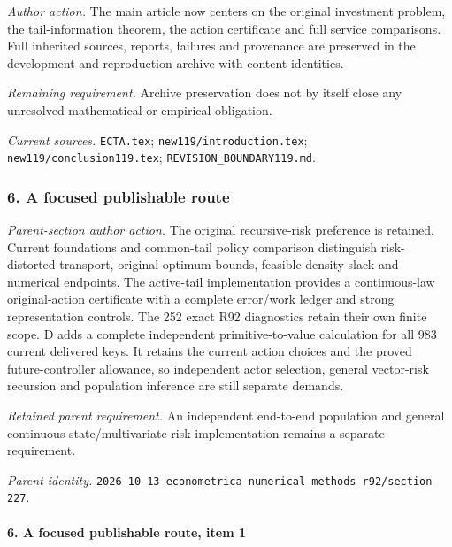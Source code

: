 \par\emph{Author action.} The main article now centers on the original investment problem, the tail-information theorem, the action certificate and full service comparisons. Full inherited sources, reports, failures and provenance are preserved in the development and reproduction archive with content identities.

\par\emph{Remaining requirement.} Archive preservation does not by itself close any unresolved mathematical or empirical obligation.

\par\emph{Current sources.} \nolinkurl{ECTA.tex}; \nolinkurl{new119/introduction.tex}; \nolinkurl{new119/conclusion119.tex}; \nolinkurl{REVISION_BOUNDARY119.md}.

\subsubsection{6. A focused publishable route}

\emph{Parent-section author action.} The original recursive-risk preference is retained. Current foundations and common-tail policy comparison distinguish risk-distorted transport, original-optimum bounds, feasible density slack and numerical endpoints. The active-tail implementation provides a continuous-law original-action certificate with a complete error/\allowbreak{}work ledger and strong representation controls. The 252 exact R92 diagnostics retain their own finite scope. D adds a complete independent primitive-to-value calculation for all 983 current delivered keys. It retains the current action choices and the proved future-controller allowance, so independent actor selection, general vector-risk recursion and population inference are still separate demands.

\par\emph{Retained parent requirement.} An independent end-to-end population and general continuous-state/\allowbreak{}multivariate-risk implementation remains a separate requirement.

\par\emph{Parent identity.} \nolinkurl{2026-10-13-econometrica-numerical-methods-r92/section-227}.

\paragraph{6. A focused publishable route, item 1}

